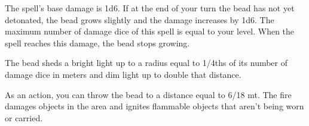     The spell's base damage is 1d6.
    If at the end of your turn the bead has not yet detonated, the bead grows slightly and the damage increases by 1d6.
    The maximum number of damage dice of this spell is equal to your level.
    When the spell reaches this damage, the bead stops growing.

    The bead sheds a bright light up to a radius equal to 1/4ths of its number of damage dice in meters and dim light up to double that distance.

    As an action, you can throw the bead to a distance equal to 6/18 mt.
    The fire damages objects in the area and ignites flammable objects that aren't being worn or carried.
